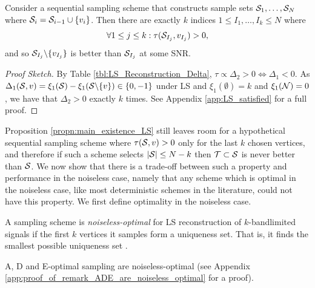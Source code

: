 \begin{propn}
   \label{propn:main_existence_LS} 
   Consider a sequential sampling scheme that constructs sample sets $\mathcal{S}_{1}, \ldots, \mathcal{S}_{N}$ where $\mathcal{S}_{i} = \mathcal{S}_{i-1} \cup \{ v_{i} \}$. Then there are exactly $k$ indices $1 \leq I_{1}, \dots, I_{k} \leq N$ where
   \begin{equation}
        \forall 1\leq j \leq k: \tau(\mathcal{S}_{I_{j}}, v_{I_{j}}) > 0,
    \end{equation}
    and so $\mathcal{S}_{I_{j}} \backslash \{v_{I_{j}}\}$ is better than $\mathcal{S}_{I_{j}}$ at some SNR.
\end{propn}
\begin{proof}[Proof Sketch]
    By Table \ref{tbl:LS_Reconstruction_Delta}, $\tau \propto \Delta_{2} > 0 \iff \Delta_{1} < 0$. As $\Delta_{1}(\mathcal{S},v) = \xi_{1}(\mathcal{S}) - \xi_{1}(\mathcal{S}\backslash \{v\}) \in \{0,-1\}$ under LS and $\xi_{1}(\emptyset) = k$ and $\xi_{1}(\mathcal{N}) = 0$, we have that $\Delta_{2} > 0$ exactly $k$ times. See Appendix \ref{app:LS_satisfied} for a full proof.
\end{proof}
    Proposition \ref{propn:main_existence_LS} still leaves room for a hypothetical sequential sampling scheme where $\tau(\mathcal{S},v) > 0$ only for the last $k$ chosen vertices, and therefore if such a scheme selects $|\mathcal{S}| \leq N-k$ then $\mathcal{T} \subset \mathcal{S}$ is never better than $\mathcal{S}$. We now show that there is a trade-off between such a property and performance in the noiseless case, namely that
    any scheme which is optimal in the noiseless case, like most deterministic schemes in the literature, could not have this property. We first define optimality in the noiseless case.  %
    \begin{defn}
        A sampling scheme is \emph{noiseless-optimal} for LS reconstruction of $k$-bandlimited signals if the first $k$ vertices it samples form a uniqueness set. That is, it finds the smallest possible uniqueness set  \cite{shomorony2014sampling}.
    \end{defn}
    
    
\begin{remark}
\label{remark:ADE_are_noiseless_optimal}
     A, D and E-optimal sampling are noiseless-optimal (see Appendix \ref{app:proof_of_remark_ADE_are_noiseless_optimal} for a proof). \end{remark} 
     
